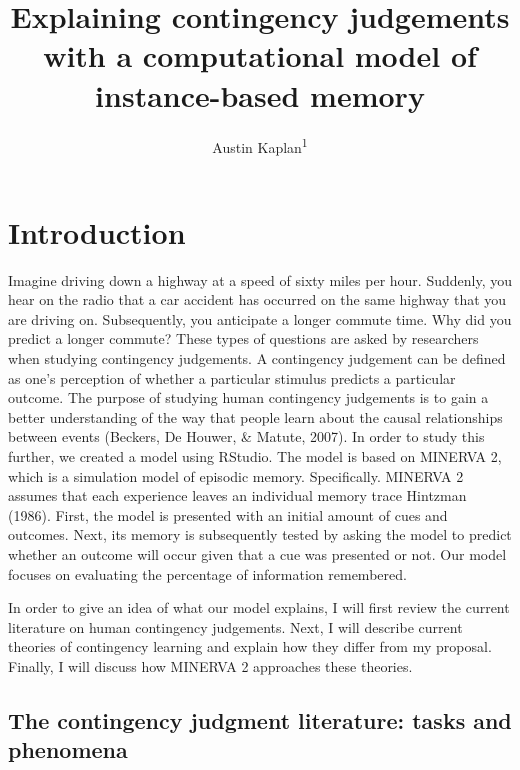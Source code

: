\documentclass[
  english,
  man,floatsintext]{apa6}
\title{Explaining contingency judgements with a computational model of instance-based memory}
\author{Austin Kaplan\textsuperscript{1}}
\date{}
\affiliation{\vspace{0.5cm}\textsuperscript{1} Brooklyn College}
\begin{document}
\maketitle

\hypertarget{introduction}{%
\section{Introduction}\label{introduction}}

Imagine driving down a highway at a speed of sixty miles per hour. Suddenly, you hear on the radio that a car accident has occurred on the same highway that you are driving on. Subsequently, you anticipate a longer commute time. Why did you predict a longer commute? These types of questions are asked by researchers when studying contingency judgements. A contingency judgement can be defined as one's perception of whether a particular stimulus predicts a particular outcome. The purpose of studying human contingency judgements is to gain a better understanding of the way that people learn about the causal relationships between events (Beckers, De Houwer, \& Matute, 2007).
In order to study this further, we created a model using RStudio. The model is based on MINERVA 2, which is a simulation model of episodic memory. Specifically. MINERVA 2 assumes that each experience leaves an individual memory trace Hintzman (1986). First, the model is presented with an initial amount of cues and outcomes. Next, its memory is subsequently tested by asking the model to predict whether an outcome will occur given that a cue was presented or not. Our model focuses on evaluating the percentage of information remembered.

In order to give an idea of what our model explains, I will first review the current literature on human contingency judgements. Next, I will describe current theories of contingency learning and explain how they differ from my proposal. Finally, I will discuss how MINERVA 2 approaches these theories.

\hypertarget{the-contingency-judgment-literature-tasks-and-phenomena}{%
\subsection{The contingency judgment literature: tasks and phenomena}\label{the-contingency-judgment-literature-tasks-and-phenomena}}
\end{document}
